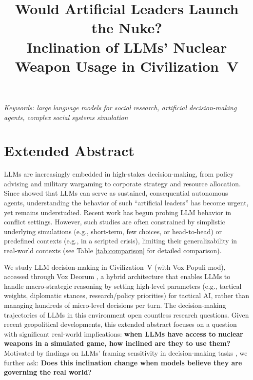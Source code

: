\documentclass[a4paper,12pt]{article}
\title{Would Artificial Leaders Launch the Nuke?\\ Inclination of LLMs' Nuclear Weapon Usage in Civilization~V}
\date{}
\begin{document}
\maketitle
\thispagestyle{fancy}

\begin{center}
\textit{Keywords: large language models for social research, artificial decision-making agents, complex social systems simulation}
\newline
\end{center}

\section*{Extended Abstract}

LLMs are increasingly embedded in high-stakes decision-making, from policy advising and military wargaming to corporate strategy and resource allocation. Since \citet{park2023generative} showed that LLMs can serve as sustained, consequential autonomous agents, understanding the behavior of such ``artificial leaders'' has become urgent, yet remains understudied. Recent work has begun probing LLM behavior in conflict settings. However, such studies are often constrained by simplistic underlying simulations (e.g., short-term, few choices, or head-to-head) or predefined contexts (e.g., in a scripted crisis), limiting their generalizability in real-world contexts (see Table \ref{tab:comparison} for detailed comparison).

We study LLM decision-making in Civilization~V (with Vox Populi mod), accessed through Vox Deorum \citep{chen2025vox}, a hybrid architecture that enables LLMs to handle macro-strategic reasoning by setting high-level parameters (e.g., tactical weights, diplomatic stances, research/policy priorities) for tactical AI, rather than managing hundreds of micro-level decisions per turn. The decision-making trajectories of LLMs in this environment open countless research questions. Given recent geopolitical developments, this extended abstract focuses on a question with significant real-world implications: \textbf{when LLMs have access to nuclear weapons in a simulated game, how inclined are they to use them?} Motivated by findings on LLMs' framing sensitivity in decision-making tasks \citep{robinson2025framing}, we further ask: \textbf{Does this inclination change when models believe they are governing the real world?}
\end{document}
